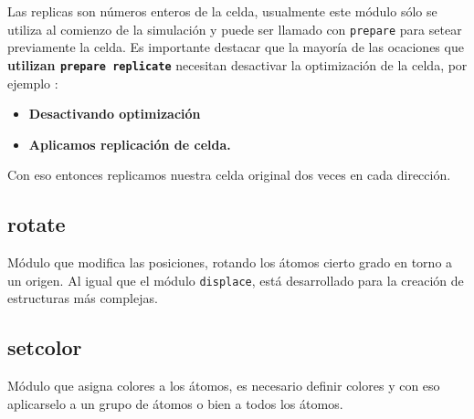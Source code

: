 Las replicas son n\'umeros enteros de la celda, usualmente este m\'odulo s\'olo
se utiliza al comienzo de la simulaci\'on y puede ser llamado con \verb|prepare|
para setear previamente la celda. Es importante destacar que la mayor\'ia de las
ocaciones que \textbf{utilizan \texttt{prepare replicate}} necesitan desactivar
la optimizaci\'on de la celda, por ejemplo :

\begin{itemize}
 \item \textbf{Desactivando optimizaci\'on}
 \item \textbf{Aplicamos replicaci\'on de celda.}
\end{itemize}

Con eso entonces replicamos nuestra celda original dos veces en cada direcci\'on.


\subsection{rotate}
M\'odulo que modifica las posiciones, rotando los \'atomos cierto grado en torno
a un origen. Al igual que el m\'odulo \verb|displace|, est\'a desarrollado para
la creaci\'on de estructuras m\'as complejas.


\subsection{setcolor}
M\'odulo que asigna colores a los \'atomos, es necesario definir colores y con
eso aplicarselo a un grupo de \'atomos o bien a todos los \'atomos. 

